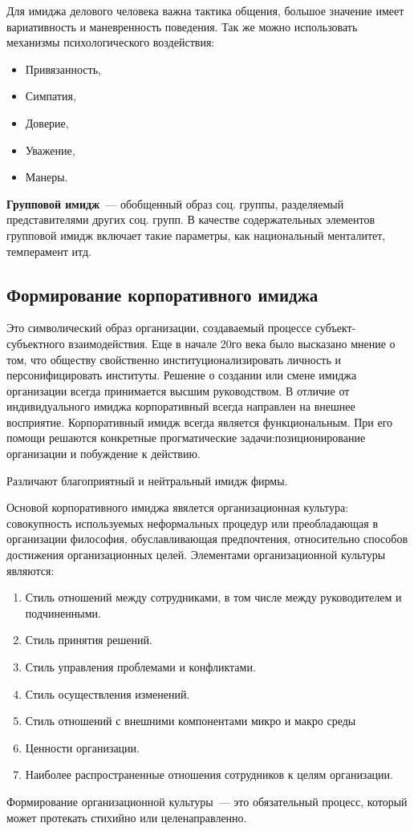 Для имиджа делового человека важна тактика общения, большое значение имеет вариативность и маневренность поведения. Так же можно использовать механизмы психологического воздействия:
\begin{itemize}
	\item Привязанность,
	\item Симпатия,
	\item Доверие,
	\item Уважение,
	\item Манеры.
\end{itemize}

\textbf{Групповой имидж}~--- обобщенный образ соц. группы, разделяемый представителями других соц. групп. В качестве содержательных элементов групповой имидж включает такие параметры, как национальный менталитет, темперамент итд.

\subsection{Формирование корпоративного имиджа}
Это символический образ организации, создаваемый процессе субъект-субъектного взаимодействия. Еще в начале 20го века было высказано мнение о том, что обществу свойственно институционализировать личность и персонифицировать институты. Решение о создании или смене имиджа организации всегда принимается высшим руководством. В отличие от индивидуального имиджа корпоративный всегда направлен на внешнее восприятие. Корпоративный имидж всегда является функциональным. При его помощи решаются конкретные прогматические задачи:позиционирование организации и побуждение к действию.

Различают благоприятный и нейтральный имидж фирмы.

Основой корпоративного имиджа явялется организационная культура: совокупность используемых неформальных процедур или преобладающая в организации философия, обуславливающая предпочтения, относительно способов достижения организационных целей. Элементами организационной культуры являются:
\begin{enumerate}
	\item Стиль отношений между сотрудниками, в том числе между руководителем и подчиненными.
	\item Стиль принятия решений.
	\item Стиль управления проблемами и конфликтами.
	\item Стиль осуществления изменений.
	\item Стиль отношений с внешними компонентами микро и макро среды
	\item Ценности организации.
	\item Наиболее распространенные отношения сотрудников к целям организации.
\end{enumerate}

Формирование организационной культуры~--- это обязательный процесс, который может протекать стихийно или целенаправленно.
